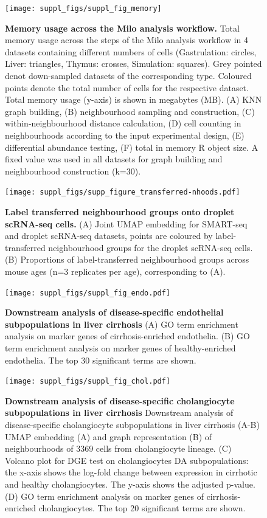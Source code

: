 \documentclass[
]{article}
\begin{document}
\begin{figure}
\texttt{[image: suppl\_figs/suppl\_fig\_memory]} \caption{\textbf{Memory usage across the Milo analysis workflow.}
Total memory usage across the steps of the Milo analysis workflow in 4 datasets containing different numbers of cells (Gastrulation: circles, Liver: triangles, Thymus: crosses, Simulation: squares). Grey pointed denot down-sampled datasets of the corresponding type. Coloured points denote the total number of cells for the respective dataset. Total memory usage (y-axis) is shown in megabytes (MB). (A) KNN graph building, (B) neighbourhood sampling and construction, (C) within-neighbourhood distance calculation, (D) cell counting in neighbourhoods according to the input experimental design, (E) differential abundance testing, (F) total in memory R object size. A fixed value was used in all datasets for graph building and neighbourhood construction (k=30).}\label{fig:sup-fig-scalability}
\end{figure}




\begin{figure}
\centering
\texttt{[image: suppl\_figs/supp\_figure\_transferred-nhoods.pdf]}
\caption{\label{fig:sup-fig-thymus-nhoods}\textbf{Label transferred neighbourhood groups onto droplet scRNA-seq cells.} (A) Joint UMAP embedding for SMART-seq and droplet scRNA-seq datasets, points are coloured by label-transferred neighbourhood groups for the droplet scRNA-seq cells. (B) Proportions of label-transferred neighbourhood groups across mouse ages (n=3 replicates per age), corresponding to (A).}
\end{figure}



\begin{figure}
\centering
\texttt{[image: suppl\_figs/suppl\_fig\_endo.pdf]}
\caption{\label{fig:sup-fig-liver-endo}\textbf{Downstream analysis of disease-specific endothelial subpopulations in liver cirrhosis}
(A) GO term enrichment analysis on marker genes of cirrhosis-enriched endothelia. (B) GO term enrichment analysis on marker genes of healthy-enriched endothelia. The top 30 significant terms are shown.}
\end{figure}




\begin{figure}
\centering
\texttt{[image: suppl\_figs/suppl\_fig\_chol.pdf]}
\caption{\label{fig:sup-fig-liver-chol}\textbf{Downstream analysis of disease-specific cholangiocyte subpopulations in liver cirrhosis}
Downstream analysis of disease-specific cholangiocyte subpopulations in liver cirrhosis
(A-B) UMAP embedding (A) and graph representation (B) of neighbourhoods of 3369 cells from cholangiocyte lineage.
(C) Volcano plot for DGE test on cholangiocytes DA subpopulations: the x-axis shows the log-fold change between expression in cirrhotic and healthy cholangiocytes. The y-axis shows the adjusted p-value.
(D) GO term enrichment analysis on marker genes of cirrhosis-enriched cholangiocytes. The top 20 significant terms are shown.}
\end{figure}
\end{document}

